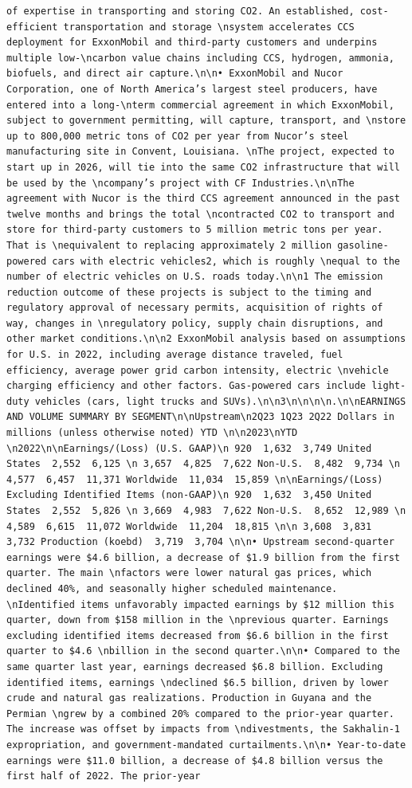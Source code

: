 \documentclass[
  letterpaper,
  DIV=11,
  numbers=noendperiod]{scrreprt}
\begin{document}
\begin{verbatim}
of expertise in transporting and storing CO2. An established, cost-efficient transportation and storage \nsystem accelerates CCS deployment for ExxonMobil and third-party customers and underpins multiple low-\ncarbon value chains including CCS, hydrogen, ammonia, biofuels, and direct air capture.\n\n• ExxonMobil and Nucor Corporation, one of North America’s largest steel producers, have entered into a long-\nterm commercial agreement in which ExxonMobil, subject to government permitting, will capture, transport, and \nstore up to 800,000 metric tons of CO2 per year from Nucor’s steel manufacturing site in Convent, Louisiana. \nThe project, expected to start up in 2026, will tie into the same CO2 infrastructure that will be used by the \ncompany’s project with CF Industries.\n\nThe agreement with Nucor is the third CCS agreement announced in the past twelve months and brings the total \ncontracted CO2 to transport and store for third-party customers to 5 million metric tons per year. That is \nequivalent to replacing approximately 2 million gasoline-powered cars with electric vehicles2, which is roughly \nequal to the number of electric vehicles on U.S. roads today.\n\n1 The emission reduction outcome of these projects is subject to the timing and regulatory approval of necessary permits, acquisition of rights of way, changes in \nregulatory policy, supply chain disruptions, and other market conditions.\n\n2 ExxonMobil analysis based on assumptions for U.S. in 2022, including average distance traveled, fuel efficiency, average power grid carbon intensity, electric \nvehicle charging efficiency and other factors. Gas-powered cars include light-duty vehicles (cars, light trucks and SUVs).\n\n3\n\n\n\n.\n\nEARNINGS AND VOLUME SUMMARY BY SEGMENT\n\nUpstream\n2Q23 1Q23 2Q22 Dollars in millions (unless otherwise noted) YTD \n\n2023\nYTD \n2022\n\nEarnings/(Loss) (U.S. GAAP)\n 920  1,632  3,749 United States  2,552  6,125 \n 3,657  4,825  7,622 Non-U.S.  8,482  9,734 \n 4,577  6,457  11,371 Worldwide  11,034  15,859 \n\nEarnings/(Loss) Excluding Identified Items (non-GAAP)\n 920  1,632  3,450 United States  2,552  5,826 \n 3,669  4,983  7,622 Non-U.S.  8,652  12,989 \n 4,589  6,615  11,072 Worldwide  11,204  18,815 \n\n 3,608  3,831  3,732 Production (koebd)  3,719  3,704 \n\n• Upstream second-quarter earnings were $4.6 billion, a decrease of $1.9 billion from the first quarter. The main \nfactors were lower natural gas prices, which declined 40%, and seasonally higher scheduled maintenance. \nIdentified items unfavorably impacted earnings by $12 million this quarter, down from $158 million in the \nprevious quarter. Earnings excluding identified items decreased from $6.6 billion in the first quarter to $4.6 \nbillion in the second quarter.\n\n• Compared to the same quarter last year, earnings decreased $6.8 billion. Excluding identified items, earnings \ndeclined $6.5 billion, driven by lower crude and natural gas realizations. Production in Guyana and the Permian \ngrew by a combined 20% compared to the prior-year quarter. The increase was offset by impacts from \ndivestments, the Sakhalin-1 expropriation, and government-mandated curtailments.\n\n• Year-to-date earnings were $11.0 billion, a decrease of $4.8 billion versus the first half of 2022. The prior-year 
\end{verbatim}
\end{document}
